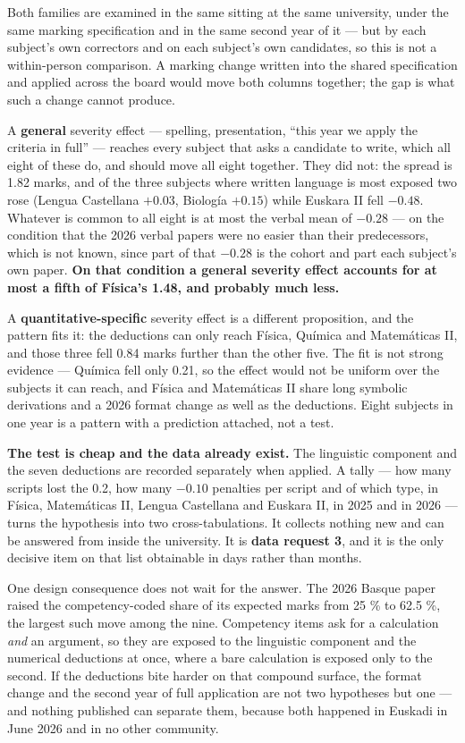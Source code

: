 \documentclass[
  10.5pt,
  a4paper,
  DIV=11,
  numbers=noendperiod]{scrartcl}
\begin{document}
Both families are examined in the same sitting at the same university,
under the same marking specification and in the same second year of it
--- but by each subject's own correctors and on each subject's own
candidates, so this is not a within-person comparison. A marking change
written into the shared specification and applied across the board would
move both columns together; the gap is what such a change cannot
produce.

A \textbf{general} severity effect --- spelling, presentation, ``this
year we apply the criteria in full'' --- reaches every subject that asks
a candidate to write, which all eight of these do, and should move all
eight together. They did not: the spread is 1.82 marks, and of the three
subjects where written language is most exposed two rose (Lengua
Castellana \(+0.03\), Biología \(+0.15\)) while Euskara II fell
\(-0.48\). Whatever is common to all eight is at most the verbal mean of
\(-0.28\) --- on the condition that the 2026 verbal papers were no
easier than their predecessors, which is not known, since part of that
\(-0.28\) is the cohort and part each subject's own paper. \textbf{On
that condition a general severity effect accounts for at most a fifth of
Física's 1.48, and probably much less.}

A \textbf{quantitative-specific} severity effect is a different
proposition, and the pattern fits it: the deductions can only reach
Física, Química and Matemáticas II, and those three fell 0.84 marks
further than the other five. The fit is not strong evidence --- Química
fell only 0.21, so the effect would not be uniform over the subjects it
can reach, and Física and Matemáticas II share long symbolic derivations
and a 2026 format change as well as the deductions. Eight subjects in
one year is a pattern with a prediction attached, not a test.

\textbf{The test is cheap and the data already exist.} The linguistic
component and the seven deductions are recorded separately when applied.
A tally --- how many scripts lost the 0.2, how many \(-0.10\) penalties
per script and of which type, in Física, Matemáticas II, Lengua
Castellana and Euskara II, in 2025 and in 2026 --- turns the hypothesis
into two cross-tabulations. It collects nothing new and can be answered
from inside the university. It is \textbf{data request 3}, and it is the
only decisive item on that list obtainable in days rather than months.

One design consequence does not wait for the answer. The 2026 Basque
paper raised the competency-coded share of its expected marks from 25 \%
to 62.5 \%, the largest such move among the nine. Competency items ask
for a calculation \emph{and} an argument, so they are exposed to the
linguistic component and the numerical deductions at once, where a bare
calculation is exposed only to the second. If the deductions bite harder
on that compound surface, the format change and the second year of full
application are not two hypotheses but one --- and nothing published can
separate them, because both happened in Euskadi in June 2026 and in no
other community.
\end{document}
